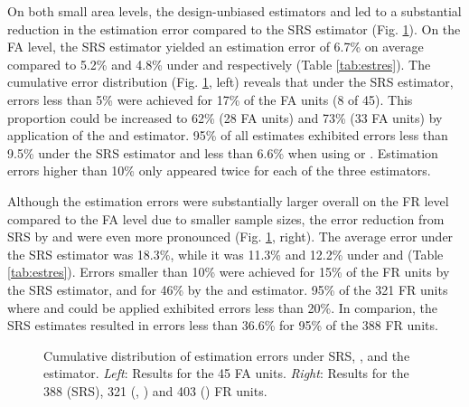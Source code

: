 On both small area levels, the design-unbiased estimators \psmall{} and \extpsynth{} led to a substantial reduction in the estimation error compared to the SRS estimator (Fig. \ref{fig:disterrors}). On the FA level, the SRS estimator yielded an estimation error of 6.7\% on average compared to 5.2\% and 4.8\% under \extpsynth{} and \psmall{} respectively (Table \ref{tab:estres}). The cumulative error distribution (Fig. \ref{fig:disterrors}, left) reveals that under the SRS estimator, errors less than 5\% were achieved for 17\% of the FA units (8 of 45). This proportion could be increased to 62\% (28 FA units) and 73\% (33 FA units) by application of the \psmall{} and \extpsynth{} estimator. 95\% of all estimates exhibited errors less than 9.5\% under the SRS estimator and less than 6.6\% when using \psmall{} or \extpsynth{}. Estimation errors higher than 10\% only appeared twice for each of the three estimators.\par
Although the estimation errors were substantially larger overall on the FR level compared to the FA level due to smaller sample sizes, the error reduction from SRS by \psmall{} and \extpsynth{} were even more pronounced (Fig. \ref{fig:disterrors}, right). The average error under the SRS estimator was 18.3\%, while it was 11.3\% and 12.2\% under \psmall{} and \extpsynth{} (Table \ref{tab:estres}). Errors smaller than 10\% were achieved for 15\% of the FR units by the SRS estimator, and for 46\% by the \psmall{} and \psynth{} estimator. 95\% of the 321 FR units where \psmall{} and \extpsynth{} could be applied exhibited errors less than 20\%. In comparion, the SRS estimates resulted in errors less than 36.6\% for 95\% of the 388 FR units.

\begin{figure}[H]
	\centering
	\caption{Cumulative distribution of estimation errors under SRS, \psmall{}, \extpsynth{} and the \psynth{} estimator. \textit{Left}: Results for the 45 FA units. \textit{Right}: Results for the 388 (SRS), 321 (\psmall{}, \extpsynth{}) and 403 (\psynth{}) FR units.}
	\label{fig:disterrors}
\end{figure}

